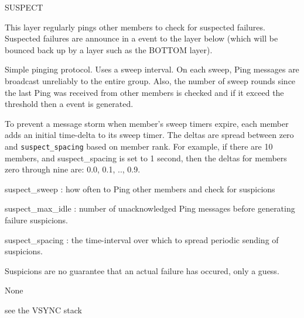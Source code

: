 %
%
%
\begin{Layer}{SUSPECT}

This layer regularly pings other members to check for suspected
failures.  Suspected failures are announce in a  event to
the layer below (which will be bounced back up by a layer such as the
BOTTOM layer).

\begin{Protocol}
Simple pinging protocol.  Uses a sweep interval.  On each sweep, Ping
messages are broadcast unreliably to the entire group.  Also, the
number of sweep rounds since the last Ping was received from other
members is checked and if it exceed the  threshold
then a  event is generated.  

To prevent a message storm when member's sweep timers expire, each
member adds an initial time-delta to its sweep timer. The deltas are
spread between zero and {\tt suspect\_spacing} based on member rank.
For example, if there are 10 members, and suspect\_spacing is set to 1
second, then the deltas for members zero through nine are: 0.0, 0.1,
.., 0.9.
\end{Protocol}

\begin{Parameters}
\item 
suspect\_sweep : how often to Ping other members and check for suspicions
\item
suspect\_max\_idle : number of unacknowledged Ping messages before generating
failure suspicions.
\item 
suspect\_spacing : the time-interval over which to spread periodic
sending of suspicions.
\end{Parameters}

\begin{Properties}
\item
Suspicions are no guarantee that an actual failure has occured, only a guess.
\end{Properties}

\begin{Notes}
\item None
\end{Notes}

\begin{Sources}
\end{Sources}

\begin{GenEvent}
\end{GenEvent}

\begin{Testing}
\item see the VSYNC stack
\end{Testing}
\end{Layer}
